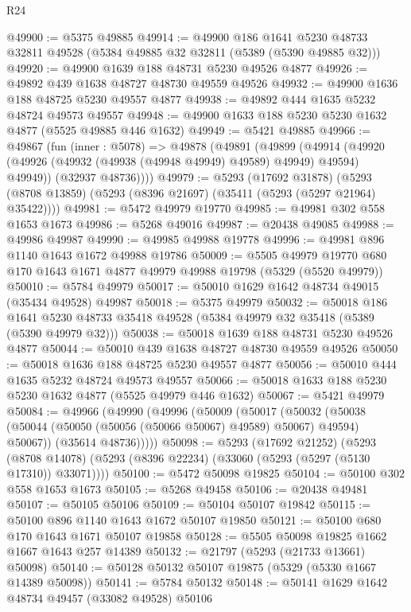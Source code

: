 \begin{lexlean}{R24}
\begin{coremodule}
@49900 := @5375 @49885
@49914 := @49900
    @186
    @1641
    @5230
    @48733
    @32811
    @49528
    (@5384 @49885 @32 @32811 (@5389 (@5390 @49885 @32)))
@49920 := @49900 @1639 @188 @48731 @5230 @49526 @4877
@49926 := @49892 @439 @1638 @48727 @48730 @49559 @49526
@49932 := @49900 @1636 @188 @48725 @5230 @49557 @4877
@49938 := @49892 @444 @1635 @5232 @48724 @49573 @49557
@49948 := @49900 @1633 @188 @5230 @5230 @1632 @4877 (@5525 @49885 @446 @1632)
@49949 := @5421 @49885
@49966 := @49867
    (fun (inner : @5078) =>
    @49878
      (@49891
        (@49899
          (@49914 (@49920 (@49926 (@49932 (@49938 (@49948 @49949) @49589) @49949) @49594) @49949))
          (@32937 @48736))))
@49979 := @5293
    (@17692 @31878)
    (@5293 (@8708 @13859) (@5293 (@8396 @21697) (@35411 (@5293 (@5297 @21964) @35422))))
@49981 := @5472 @49979 @19770
@49985 := @49981 @302 @558 @1653 @1673
@49986 := @5268 @49016
@49987 := @20438 @49085
@49988 := @49986 @49987
@49990 := @49985 @49988 @19778
@49996 := @49981 @896 @1140 @1643 @1672 @49988 @19786
@50009 := @5505
    @49979
    @19770
    @680
    @170
    @1643
    @1671
    @4877
    @49979
    @49988
    @19798
    (@5329 (@5520 @49979))
@50010 := @5784 @49979
@50017 := @50010 @1629 @1642 @48734 @49015 (@35434 @49528) @49987
@50018 := @5375 @49979
@50032 := @50018
    @186
    @1641
    @5230
    @48733
    @35418
    @49528
    (@5384 @49979 @32 @35418 (@5389 (@5390 @49979 @32)))
@50038 := @50018 @1639 @188 @48731 @5230 @49526 @4877
@50044 := @50010 @439 @1638 @48727 @48730 @49559 @49526
@50050 := @50018 @1636 @188 @48725 @5230 @49557 @4877
@50056 := @50010 @444 @1635 @5232 @48724 @49573 @49557
@50066 := @50018 @1633 @188 @5230 @5230 @1632 @4877 (@5525 @49979 @446 @1632)
@50067 := @5421 @49979
@50084 := @49966
    (@49990
      (@49996
        (@50009
          (@50017
            (@50032 (@50038 (@50044 (@50050 (@50056 (@50066 @50067) @49589) @50067) @49594) @50067))
            (@35614 @48736)))))
@50098 := @5293
    (@17692 @21252)
    (@5293 (@8708 @14078) (@5293 (@8396 @22234) (@33060 (@5293 (@5297 (@5130 @17310)) @33071))))
@50100 := @5472 @50098 @19825
@50104 := @50100 @302 @558 @1653 @1673
@50105 := @5268 @49458
@50106 := @20438 @49481
@50107 := @50105 @50106
@50109 := @50104 @50107 @19842
@50115 := @50100 @896 @1140 @1643 @1672 @50107 @19850
@50121 := @50100 @680 @170 @1643 @1671 @50107 @19858
@50128 := @5505 @50098 @19825 @1662 @1667 @1643 @257 @14389
@50132 := @21797 (@5293 (@21733 @13661) @50098)
@50140 := @50128 @50132 @50107 @19875 (@5329 (@5330 @1667 @14389 @50098))
@50141 := @5784 @50132
@50148 := @50141 @1629 @1642 @48734 @49457 (@33082 @49528) @50106

\end{coremodule}
\end{lexlean}
